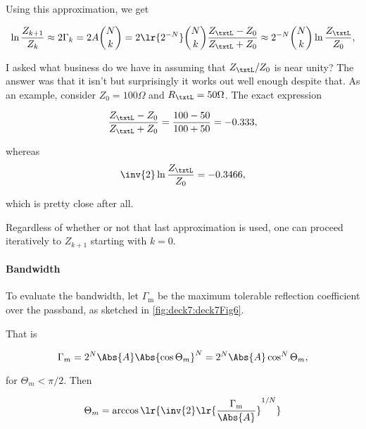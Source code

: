 Using this approximation, we get

\begin{dmath}\label{eqn:uwavesDeck7MultisectionTransformersCore:380}
\ln \frac{Z_{k+1}}{Z_k}
\approx
2 \Gamma_k 
= 2 A \binom{N}{k}
= 2 \lr{2^{-N}} \binom{N}{k} \frac{Z_\txtL - Z_0}{Z_\txtL + Z_0}
\approx
2^{-N} \binom{N}{k} \ln \frac{Z_\txtL}{Z_0},
\end{dmath}

I asked what business do we have in assuming that \( Z_\txtL/Z_0 \) is near unity?  The answer was that it isn't but surprisingly it works out well enough despite that.  As an example, consider \( Z_0 = 100 \Omega \) and \( R_\txtL = 50 \Omega \).  The exact expression

\begin{dmath}\label{eqn:uwavesDeck7MultisectionTransformersCore:880}
\frac{Z_\txtL - Z_0}{Z_\txtL + Z_0} 
= \frac{100-50}{100+50} 
= -0.333,
\end{dmath}

whereas
\begin{dmath}\label{eqn:uwavesDeck7MultisectionTransformersCore:900}
\inv{2} \ln \frac{Z_\txtL}{Z_0} = -0.3466,
\end{dmath}

which is pretty close after all.

Regardless of whether or not that last approximation is used, one can proceed iteratively to \( Z_{k+1} \) starting with \( k = 0 \).

\paragraph{Bandwidth}

To evaluate the bandwidth, let \( \Gamma_{\mathrm{m}} \) be the maximum tolerable reflection coefficient over the passband, as sketched in \cref{fig:deck7:deck7Fig6}.


That is

\begin{dmath}\label{eqn:uwavesDeck7MultisectionTransformersCore:400}
\Gamma_m 
= 2^N \Abs{A} \Abs{\cos \Theta_m }^N 
= 2^N \Abs{A} \cos^N \Theta_m,
\end{dmath}

for \( \Theta_m < \pi/2 \).  Then

\begin{dmath}\label{eqn:uwavesDeck7MultisectionTransformersCore:420}
\Theta_m = \arccos\lr{ \inv{2} \lr{ \frac{\Gamma_{\mathrm{m}}}{\Abs{A}}}^{1/N} }
\end{dmath}


